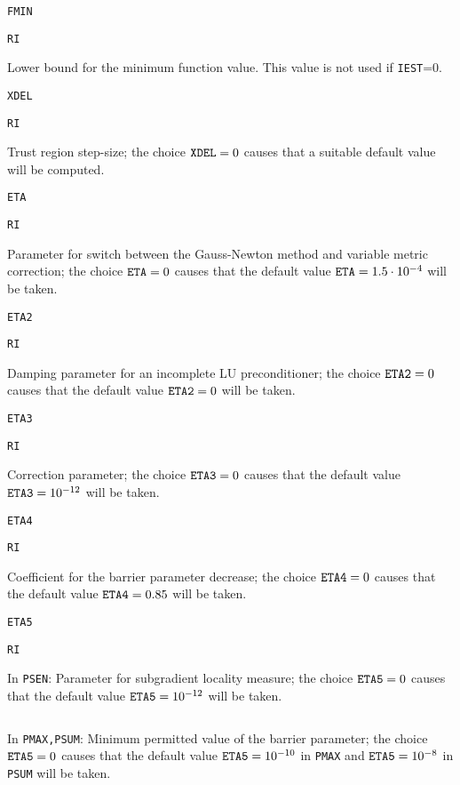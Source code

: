 \documentclass{esub2acm}
\begin{document}
\noindent\parbox{20mm}{\tt FMIN}\parbox{10mm}{\tt RI}\parbox[t]{125mm}{
  Lower bound for the minimum function value. This value is not used if
  {\tt IEST}=0.}
  \par\vspace{2mm}
\noindent\parbox{20mm}{\tt XDEL}\parbox{10mm}{\tt RI}\parbox[t]{125mm}{
  Trust region step-size; the choice ${\tt XDEL}=0$ causes that a suitable default
  value will be computed.}
  \par\vspace{2mm}
\noindent\parbox{20mm}{\tt ETA}\parbox{10mm}{\tt RI}\parbox[t]{125mm}{
  Parameter for switch between the Gauss-Newton method and variable metric
  correction; the choice ${\tt ETA}=0$ causes that the default value
  ${\tt ETA}=1.5 \cdot 10^{-4}$ will be taken.}
  \par\vspace{2mm}
\noindent\parbox{20mm}{\tt ETA2}\parbox{10mm}{\tt RI}\parbox[t]{125mm}{
  Damping parameter for an incomplete LU preconditioner; the choice
  ${\tt ETA2}=0$ causes that the default value ${\tt ETA2}=0$ will be taken.}
  \par\vspace{2mm}
\noindent\parbox{20mm}{\tt ETA3}\parbox{10mm}{\tt RI}\parbox[t]{125mm}{
  Correction parameter; the choice ${\tt ETA3}=0$ causes that the default value
  ${\tt ETA3}=10^{-12}$ will be taken.}
  \par\vspace{2mm}
\noindent\parbox{20mm}{\tt ETA4}\parbox{10mm}{\tt RI}\parbox[t]{125mm}{
  Coefficient for the barrier parameter decrease; the choice ${\tt ETA4}=0$ causes
  that the default value ${\tt ETA4}=0.85$ will be taken.}
  \par\vspace{2mm}
\noindent\parbox{20mm}{\tt ETA5}\parbox{10mm}{\tt RI}\parbox[t]{125mm}{
  In {\tt PSEN}: Parameter for subgradient locality measure; the choice
  ${\tt ETA5}=0$ causes that the default value ${\tt ETA5}=10^{-12}$ will be taken.}
  \par\vspace{1mm}
\noindent \parbox{30mm}{$\;$}\parbox[t]{125mm}{In {\tt PMAX,PSUM}: Minimum
  permitted value of the barrier parameter; the choice ${\tt ETA5}=0$ causes that
  the default value ${\tt ETA5}=10^{-10}$ in {\tt PMAX} and ${\tt ETA5}=10^{-8}$
  in {\tt PSUM} will be taken.}
  \par

\vspace{3mm}
\end{document}
